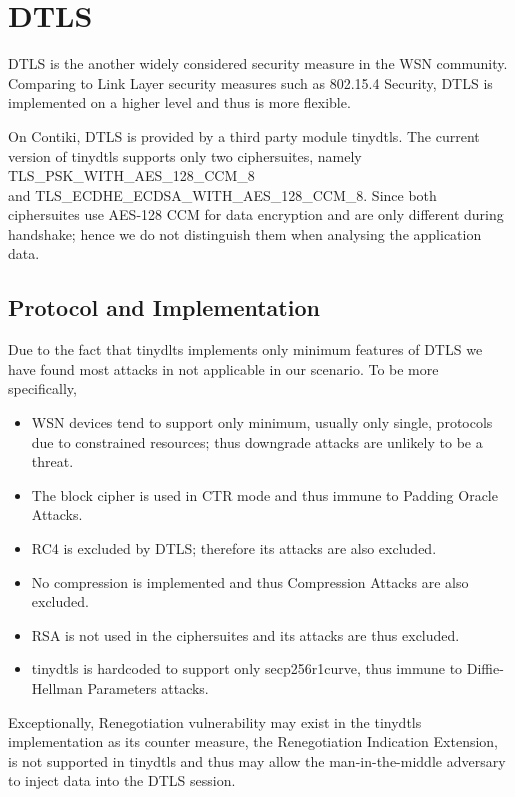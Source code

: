 \chapter{DTLS} \label{Chp: DTLS}

DTLS is the another widely considered security measure in the WSN community. Comparing to Link Layer security measures such as 802.15.4 Security, DTLS is implemented on a higher level and thus is more flexible. 

On Contiki, DTLS is provided by a third party module tinydtls. The current version of tinydtls supports only two ciphersuites, namely TLS\_PSK\_WITH\_AES\_128\_CCM\_8 \\
and TLS\_ECDHE\_ECDSA\_WITH\_AES\_128\_CCM\_8. Since both ciphersuites use AES-128 CCM for data encryption and are only different during handshake; hence we do not distinguish them when analysing the application data.

\section{Protocol and Implementation}

Due to the fact that tinydlts implements only minimum features of DTLS we have found most attacks in \cite{rfc7457} not applicable in our scenario. To be more specifically,

\begin{itemize}
	\item WSN devices tend to support only minimum, usually only single, protocols due to constrained resources; thus downgrade attacks are unlikely to be a threat.
	\item The block cipher is used in CTR mode and thus immune to Padding Oracle Attacks.
	\item RC4 is excluded by DTLS; therefore its attacks are also excluded.
	\item No compression is implemented and thus Compression Attacks are also excluded.
	\item RSA is not used in the ciphersuites and its attacks are thus excluded.
	\item tinydtls is hardcoded to support only secp256r1curve, thus immune to Diffie-Hellman Parameters attacks.
\end{itemize}

Exceptionally, Renegotiation vulnerability\cite{rfc5746} may exist in the tinydtls implementation as its counter measure, the Renegotiation Indication Extension, is not supported in tinydtls and thus may allow the man-in-the-middle adversary to inject data into the DTLS session.

